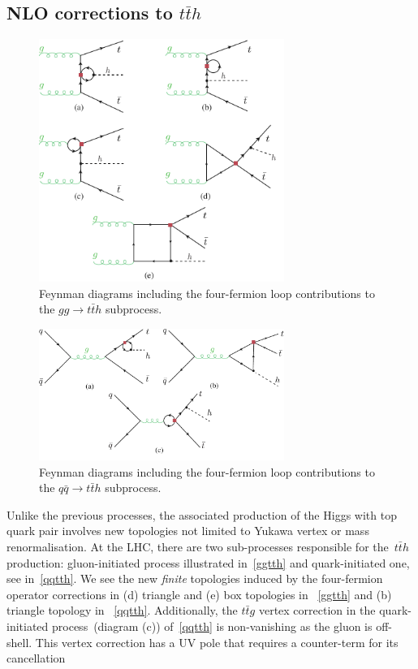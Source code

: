 \subsection{NLO corrections to $t\bar th$}
\begin{figure}[h!]
	\centering
	\includegraphics[width=8cm]{./fig/ggttH-4F_NLO}
	\caption{Feynman diagrams including the four-fermion loop contributions to the $ gg \to t\bar{t} h$ subprocess.}
	\label{ggtth}
\end{figure}
\begin{figure}[hth]
	\centering
	\includegraphics[width=8cm]{./fig/qqttH-4F_NLO}
	\caption{Feynman diagrams including the four-fermion loop contributions to the  $ q \bar{q} \to t\bar{t} h$ subprocess.}
	\label{qqtth}
\end{figure}
\par Unlike the previous processes, the associated production of the Higgs with top quark pair involves new topologies not limited to Yukawa vertex or mass renormalisation.  At the LHC, there are two sub-processes responsible for the~$t\bar t h$ production: gluon-initiated process illustrated in~\autoref{ggtth} and quark-initiated one, see in~\autoref{qqtth}. We see the new \emph{finite} topologies induced by the four-fermion operator corrections in (d) triangle and (e) box topologies in ~\autoref{ggtth} and (b) triangle topology in ~\autoref{qqtth}.  Additionally, the $t\bar t g$ vertex correction in the quark-initiated process~(diagram (c)) of~\autoref{qqtth} is non-vanishing as the gluon is off-shell. This vertex correction has a UV pole that requires a counter-term for its cancellation
